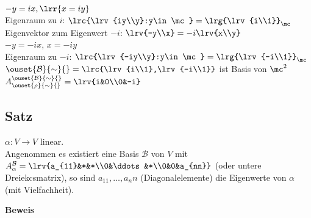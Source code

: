\begin{enumerate}[a)]
    	  $-y=ix,\lrr{x=iy}$\\
    	  Eigenraum zu $i$: $\lrc{\lrv{iy\\y}:y\in\mc}=\lrg{\lrv{i\\1}}_\mc$\\
    	  Eigenvektor zum Eigenwert $-i$: $\lrv{-y\\x}=-i\lrv{x\\y}$\\
    	  $-y=-ix$, $x=-iy$\\
    	  Eigenraum zu $-i$: $\lrc{\lrv{-iy\\y}:y\in\mc}=\lrg{\lrv{-i\\1}}_\mc$\\
    	  $\ouset{\mathcal{B}}{\sim}{}=\lrc{\lrv{i\\1},\lrv{-i\\1}}$ ist Basis von $\mc^2$\\
    	  $A_{\ouset{\rho}{\sim}{}}^{\ouset{\mathcal{B}}{\sim}{}}=\lrv{i&0\\0&-i}$  
  \end{enumerate}

\subsection{Satz}
	$\alpha:V\rightarrow V$ linear.\\
	Angenommen es existiert eine Basis $\mathcal{B}$ von $V$ mit $A_\alpha^\mathcal{B}=\lrv{a_{11}&*&*\\0&\ddots&*\\0&0&a_{nn}}$ (oder untere Dreiekcsmatrix), so sind $a_{11},\dots,{a_nn}$ (Diagonalelemente) die Eigenwerte von $\alpha$ (mit Vielfachheit).
	
	\textbf{Beweis}
	
